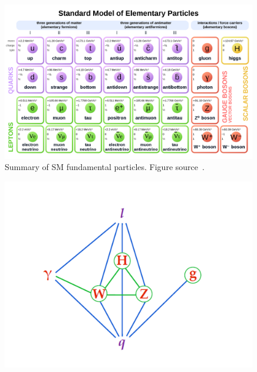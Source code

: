 
\begin{figure}[t!]
\centering
\includegraphics[width=0.99\textwidth]{figures/SMtable.png}
\caption[Summary of standard model fundamental particles]{Summary of SM fundamental particles. Figure source~\cite{SMtable}.
\label{fig:SMParticles}}
\end{figure}

\begin{figure}[t!]
\centering
\includegraphics[width=0.99\textwidth]{figures/SM_coupling.png}
\caption[interactions between fundamental particles]{
\label{fig:SMcoupling}}
\end{figure}
